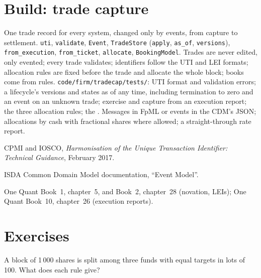 \section{Build: trade capture}\label{bld:pl:trade-capture-and-booking:tradecap}

\begin{build}
 One trade record for every system, changed only by events, from capture to settlement.
 \texttt{uti}, \texttt{validate}, \texttt{Event}, \texttt{TradeStore} (\texttt{apply}, \texttt{as\_of},
\texttt{versions}), \texttt{from\_execution}, \texttt{from\_ticket}, \texttt{allocate}, \texttt{BookingModel}.
 Trades are never edited, only evented; every trade validates; identifiers follow the UTI and LEI formats; allocation rules are
fixed before the trade and allocate the whole block; books come from rules.
 \texttt{code/firm/tradecap/tests/}: UTI format and validation errors; a lifecycle's versions and states as of any
time, including termination to zero and an event on an unknown trade; exercise and capture from an execution report; the three allocation
rules; the .
 Messages in FpML or events in the CDM's JSON; allocations by cash with fractional shares where allowed; a straight-through
rate report.
\end{build}

\begin{omsources}
\item CPMI and IOSCO, \emph{Harmonisation of the Unique Transaction Identifier: Technical Guidance}, February 2017.
\item ISDA Common Domain Model documentation, ``Event Model''.
\item One Quant Book~1, chapter~5, and Book~2, chapter~28 (novation, LEIs); One Quant Book~10, chapter~26 (execution reports).
\end{omsources}

\section{Exercises}

\begin{exercise}[$\star$]\label{exo:pl:trade-capture-and-booking:1}
A block of 1\,000 shares is split among three funds with equal targets in lots of 100. What does each rule give?
\end{exercise}

